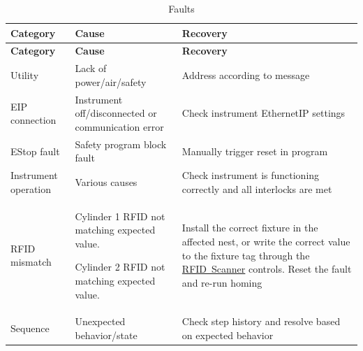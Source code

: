  

\hypertarget{faults_faults_fault_tbl}{}
\tabulinesep=1mm
\begin{longtabu}spread 0pt [c]{*{3}{|X[-1]}|}
\caption{Faults}\label{faults_faults_fault_tbl}\\
\hline
\cellcolor{\tableheadbgcolor}\textbf{ Category}&\cellcolor{\tableheadbgcolor}\textbf{ Cause}&\cellcolor{\tableheadbgcolor}\textbf{ Recovery }\\
\endfirsthead
\hline
\endfoot
\hline
\cellcolor{\tableheadbgcolor}\textbf{ Category}&\cellcolor{\tableheadbgcolor}\textbf{ Cause}&\cellcolor{\tableheadbgcolor}\textbf{ Recovery }\\
\endhead
Utility&Lack of power/air/safety&Address according to message \\
EIP connection&Instrument off/disconnected or communication error&Check instrument Ethernet\+IP settings \\
EStop fault&Safety program block fault&Manually trigger reset in program \\
Instrument operation&Various causes&Check instrument is functioning correctly and all interlocks are met \\
RFID mismatch&
\begin{DoxyItemize}
\item Cylinder 1 RFID not matching expected value. 
\item Cylinder 2 RFID not matching expected value. 
\end{DoxyItemize}&Install the correct fixture in the affected nest, or write the correct value to the fixture tag through the \mbox{\hyperlink{gui_gui_manual_rfid}{RFID Scanner}} controls. Reset the fault and re-\/run homing \\
Sequence&Unexpected behavior/state&Check step history and resolve based on expected behavior \\
\end{longtabu}


